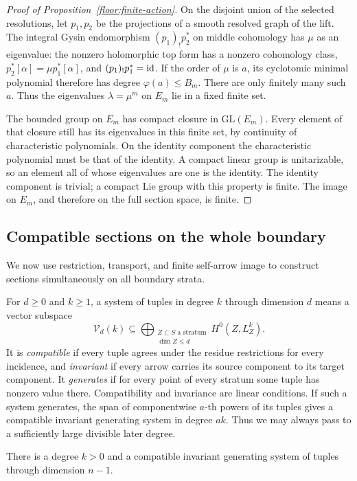 \begin{proof}[Proof of Proposition~\ref{floor:finite-action}]
On the disjoint union of the selected resolutions, let \(p_1,p_2\) be the
projections of a smooth resolved graph of the lift.  The integral Gysin
endomorphism \((p_1)_!p_2^*\) on middle cohomology has \(\mu\) as an eigenvalue:
the nonzero holomorphic top form has a nonzero cohomology class,
\(p_2^*[\alpha]=\mu p_1^*[\alpha]\), and \((p_1)_!p_1^*=\mathrm{id}\).
If the order of \(\mu\) is \(a\), its
cyclotomic minimal polynomial therefore has degree \(\varphi(a)\leq B_m\).
There are only finitely many such \(a\).  Thus the eigenvalues
\(\lambda=\mu^m\) on \(E_m\) lie in a fixed finite set.

The bounded group on \(E_m\) has compact closure in \(\mathrm{GL}(E_m)\).
Every element of that closure still has its eigenvalues in this finite set,
by continuity of characteristic polynomials.  On the identity component
the characteristic polynomial must be that of the identity.  A compact
linear group is unitarizable, so an element all of whose eigenvalues are
one is the identity.  The identity component is trivial; a compact Lie
group with this property is finite.  The image on \(E_m\), and therefore
on the full section space, is finite.
\end{proof}

\subsection{Compatible sections on the whole boundary}

We now use restriction, transport, and finite self-arrow image to construct
sections simultaneously on all boundary strata.

For \(d\geq0\) and \(k\geq1\), a system of tuples in degree \(k\) through dimension
\(d\) means a vector subspace
\[
 \mathcal V_d(k)\subseteq
       \bigoplus_{\substack{Z\subset S\text{ a stratum}\\\dim Z\leq d}}
                      H^0(Z,L_Z^k).
\]
It is \emph{compatible} if every tuple agrees under the residue restrictions
for every incidence, and \emph{invariant} if every arrow carries its source
component to its target component.  It \emph{generates} if for every point
of every stratum some tuple has nonzero value there.  Compatibility and
invariance are linear conditions.  If such a system generates, the span
of componentwise \(a\)-th powers of its tuples gives a compatible
invariant generating system in degree \(ak\).  Thus we may always pass to
a sufficiently large divisible later degree.

\begin{proposition}\label{floor:tuples}
There is a degree \(k>0\) and a compatible invariant generating system
of tuples through dimension \(n-1\).
\end{proposition}

